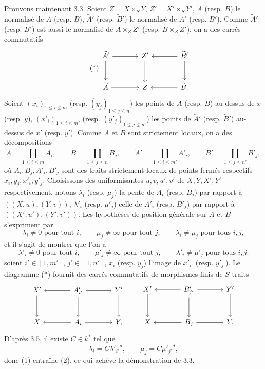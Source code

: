 Prouvons maintenant 3.3. Soient $Z=X\times_SY$, $Z'=X'\times_SY'$, $\widetilde A$ (resp. $\widetilde B$) le normalisé de $A$ (resp. $B$), $\widetilde A'$ (resp. $\widetilde B'$) le normalisé de $A'$ (resp. $B'$). Comme $\widetilde A'$ (resp. $\widetilde B'$) est aussi le normalisé de $\widetilde A\times_ZZ'$ (resp. $\widetilde B\times_ZZ'$), on a des carrés commutatifs
\begin{equation}
\tag{*}
\begin{tikzcd}[column sep=large,row sep=large]
\widetilde A' \arrow[r] \arrow[d] & Z' \arrow[d] & \widetilde B' \arrow[l] \arrow[d]\\
\widetilde A \arrow[r] & Z & \widetilde B . \arrow[l]
\end{tikzcd}
\end{equation}
Soient $(x_i)_{1\le i\le m}$ (resp. $(y_j)_{1\le j\le n}$) les points de $\widetilde A$ (resp. $\widetilde B$) au-dessus de $x$ (resp. $y$), $(x'_i)_{1\le i\le m'}$ (resp. $(y'_j)_{1\le j\le n'}$) les points de $\widetilde A'$ (resp. $\widetilde B'$) au-dessus de $x'$ (resp. $y'$). Comme $A$ et $B$ sont strictement locaux, on a des décompositions
\[
\widetilde A=\coprod_{1\le i\le m}A_i,\qquad
\widetilde B=\coprod_{1\le j\le n}B_j,\qquad
\widetilde A'=\coprod_{1\le i\le m'}A'_i,\qquad
\widetilde B'=\coprod_{1\le j\le n'}B'_j,
\]
où $A_i,B_j,A'_i,B'_j$ sont des traits strictement locaux de points fermés respectifs $x_i,y_j,x'_i,y'_j$. Choisissons des uniformisantes $u,v,u',v'$ de $X,Y,X',Y'$ respectivement, notons $\lambda_i$ (resp. $\mu_j$) la pente de $A_i$ (resp. $B_j$) par rapport à $((X,u),(Y,v))$, $\lambda'_i$ (resp. $\mu'_j$) celle de $A'_i$ (resp. $B'_j$) par rapport à $((X',u'),(Y',v'))$. Les hypothèses de position générale sur $A$ et $B$ s'expriment par
\begin{equation}
\lambda_i\ne0\text{ pour tout }i,\qquad
\mu_j\ne\infty\text{ pour tout }j,\qquad
\lambda_i\ne\mu_j\text{ pour tous }i,j,
\tag{1}
\end{equation}
et il s'agit de montrer que l'on a
\begin{equation}
\lambda'_i\ne0\text{ pour tout }i,\qquad
\mu'_j\ne\infty\text{ pour tout }j,\qquad
\lambda'_i\ne\mu'_j\text{ pour tous }i,j.
\tag{2}
\end{equation}
soient $i'\in[1,m']$, $j'\in[1,n']$, $x_i$ (resp. $y_j$) l'image de $x'_{i'}$ (resp. $y'_{j'}$). Le diagramme (*) fournit des carrés commutatifs de morphismes finis de $S$-traits
\[
\begin{tikzcd}[column sep=large,row sep=large]
X' \arrow[d] & A'_{i'} \arrow[l] \arrow[r] \arrow[d] & Y' \arrow[d]\\
X & A_i \arrow[l] \arrow[r] & Y ,
\end{tikzcd}
\qquad
\begin{tikzcd}[column sep=large,row sep=large]
X' \arrow[d] & B'_{j'} \arrow[l] \arrow[r] \arrow[d] & Y' \arrow[d]\\
X & B_j \arrow[l] \arrow[r] & Y .
\end{tikzcd}
\]
D'après 3.5, il existe $C\in k^*$ tel que
\[
\lambda_i=C{\lambda'_{i'}}^d,\qquad
\mu_j=C{\mu'_{j'}}^d,
\]
donc (1) entraîne (2), ce qui achève la démonstration de 3.3.

